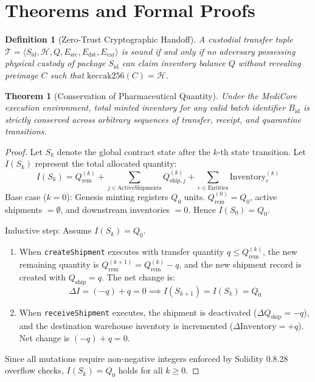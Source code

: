 \documentclass[11pt,a4paper]{article}
\newtheorem{theorem}{Theorem}
\newtheorem{definition}{Definition}
\begin{document}
\section{Theorems and Formal Proofs}

\begin{definition}[Zero-Trust Cryptographic Handoff]
A custodial transfer tuple $\mathcal{T} = \langle S_{\text{id}}, \mathcal{H}, Q, E_{\text{src}}, E_{\text{dst}}, E_{\text{car}} \rangle$ is sound if and only if no adversary possessing physical custody of package $S_{\text{id}}$ can claim inventory balance $Q$ without revealing preimage $C$ such that $\text{keccak256}(C) = \mathcal{H}$.
\end{definition}

\begin{theorem}[Conservation of Pharmaceutical Quantity]
Under the MediCore execution environment, total minted inventory for any valid batch identifier $B_{\text{id}}$ is strictly conserved across arbitrary sequences of transfer, receipt, and quarantine transitions.
\end{theorem}

\begin{proof}
Let $S_k$ denote the global contract state after the $k$-th state transition. Let $I(S_k)$ represent the total allocated quantity:
\[
I(S_k) = Q_{\text{rem}}^{(k)} + \sum_{j \in \text{ActiveShipments}} Q_{\text{ship}, j}^{(k)} + \sum_{e \in \text{Entities}} \text{Inventory}_e^{(k)}
\]
Base case ($k=0$): Genesis minting registers $Q_0$ units. $Q_{\text{rem}}^{(0)} = Q_0$, active shipments $= \emptyset$, and downstream inventories $= 0$. Hence $I(S_0) = Q_0$.

Inductive step: Assume $I(S_k) = Q_0$.
\begin{enumerate}
    \item When \texttt{createShipment} executes with transfer quantity $q \le Q_{\text{rem}}^{(k)}$, the new remaining quantity is $Q_{\text{rem}}^{(k+1)} = Q_{\text{rem}}^{(k)} - q$, and the new shipment record is created with $Q_{\text{ship}} = q$. The net change is:
    \[
    \Delta I = (-q) + q = 0 \implies I(S_{k+1}) = I(S_k) = Q_0
    \]
    \item When \texttt{receiveShipment} executes, the shipment is deactivated ($\Delta Q_{\text{ship}} = -q$), and the destination warehouse inventory is incremented ($\Delta \text{Inventory} = +q$). Net change is $(-q) + q = 0$.
\end{enumerate}
Since all mutations require non-negative integers enforced by Solidity 0.8.28 overflow checks, $I(S_k) = Q_0$ holds for all $k \ge 0$.
\end{proof}
\end{document}
